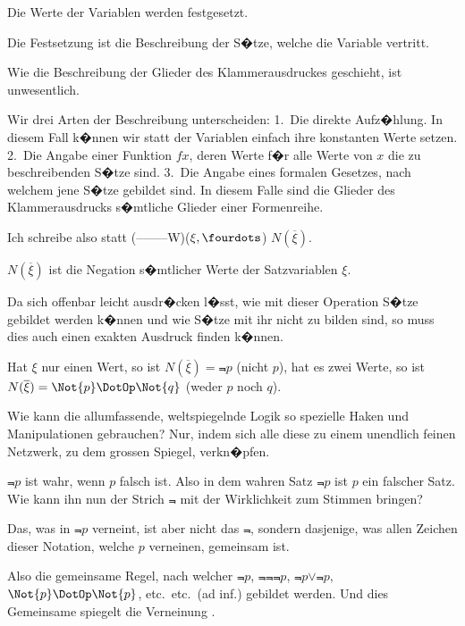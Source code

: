 \begin{propositions}
{Die Werte der Variablen werden festgesetzt.

Die Festsetzung ist die Beschreibung der S�tze,
welche die Variable vertritt.

Wie die Beschreibung der Glieder des Klammerausdruckes
geschieht, ist unwesentlich.

Wir  drei Arten der Beschreibung
unterscheiden: 1.~Die direkte Aufz�hlung. In
diesem Fall k�nnen wir statt der Variablen einfach
ihre konstanten Werte setzen. 2.~Die Angabe
einer Funktion $fx$, deren Werte f�r alle Werte von
$x$ die zu beschreibenden S�tze sind. 3.~Die Angabe
eines formalen Gesetzes, nach welchem jene S�tze
gebildet sind. In diesem Falle sind die Glieder des
Klammerausdrucks s�mtliche Glieder einer Formenreihe.}


{Ich schreibe also statt \mbox{\glqq{}(--\;--\;--\;--\;--W)}\AllowBreak($\xi, \fourdots$)\grqq{}
\glqq{}$N(\overline{\xi})$\grqq{}.

$N(\overline{\xi})$ ist die Negation s�mtlicher Werte der
Satzvariablen $\xi$.}


{Da sich offenbar leicht ausdr�cken l�sst, wie mit
dieser Operation S�tze gebildet werden k�nnen und
wie S�tze mit ihr nicht zu bilden sind, so muss
dies auch einen exakten Ausdruck finden k�nnen.}


{Hat $\xi$ nur einen Wert, so ist $N(\overline{\xi}) = \Not{p}$ (nicht $p$),
hat es zwei Werte, so ist $N(\overline{\xi}) = \Not{p} \DotOp \Not{q}$ (weder
$p$ noch $q$).}


{Wie kann die allumfassende, weltspiegelnde
Logik so spezielle Haken und Manipulationen
gebrauchen? Nur, indem sich alle diese zu einem
unendlich feinen Netzwerk, zu dem grossen Spiegel,
verkn�pfen.}


{\glqq{}$\Not{p}$\grqq{} ist wahr, wenn \glqq{}$p$\grqq{} falsch ist. Also in
dem wahren Satz \glqq{}$\Not{p}$\grqq{} ist \glqq{}$p$\grqq{} ein falscher Satz.
Wie kann ihn nun der Strich \glqq{}$\Not{}$\grqq{} mit der Wirklichkeit
zum Stimmen bringen?

Das, was in \glqq{}$\Not{p}$\grqq{} verneint, ist aber nicht das
\glqq{}$\Not{}$\grqq{}, sondern dasjenige, was allen Zeichen dieser
Notation, welche $p$ verneinen, gemeinsam ist.

Also die gemeinsame Regel, nach welcher
\glqq{}$\Not{p}$\grqq{}, \glqq{}$\Not{\Not{\Not{p}}}$\grqq{}, \glqq{}$\Not{p} \lor \Not{p}$\grqq{}, \glqq{}$\Not{p} \DotOp \Not{p}$\grqq{}, etc.\ etc.\ (ad
inf.) gebildet werden. Und dies Gemeinsame
spiegelt die Verneinung .}



\end{propositions}
